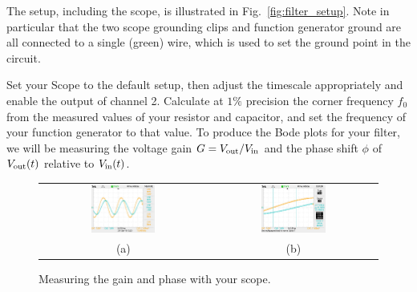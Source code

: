 The setup, including the scope, is illustrated in
Fig.~\ref{fig:filter_setup}.  Note in particular that the two scope
grounding clips and function generator ground are all connected to a
single (green) wire, which is used to set the ground point in the
circuit.

Set your Scope to the default setup, then adjust the timescale
appropriately and enable the output of channel 2.  Calculate at $1\%$
precision the corner frequency $f_0$ from the measured values of your
resistor and capacitor, and set the frequency of your function
generator to that value.  To produce the Bode plots for your filter,
we will be measuring the voltage gain $G = V_{\rm out} / V_{\rm in}$
and the phase shift $\phi$ of $V_{\rm out}(t)$ relative to $V_{\rm
  in}(t)$.

\begin{figure}[htbp]
\begin{center}
\begin{tabular}{cc}
\includegraphics[width=0.4\textwidth]{figs/labs/filters/phase_measure.jpg} &
\includegraphics[width=0.4\textwidth]{figs/labs/filters/phase_cursor.jpg} \\
(a) & (b) \\
\end{tabular}
\end{center}
\caption{\label{fig:scopegain} Measuring the gain and phase with your scope.}
\end{figure}

